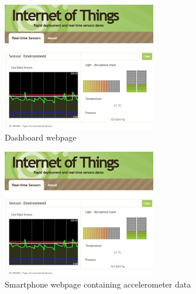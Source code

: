 \documentclass[pdftex,10pt,a4paper]{report}
\begin{document}
\begin{figure}[h!]
		\centering
		\includegraphics[width=0.6\textwidth]{./dashboard.jpg}
		\caption{Dashboard webpage}
		\label{Dashboard webpage}
\end{figure}

\begin{figure}[h!]
		\centering
		\includegraphics[width=0.6\textwidth]{./dashboard.jpg}
		\caption{Smartphone webpage containing accelerometer data}
		\label{Smartphone webpage containing accelerometer data}
\end{figure}
\end{document}
